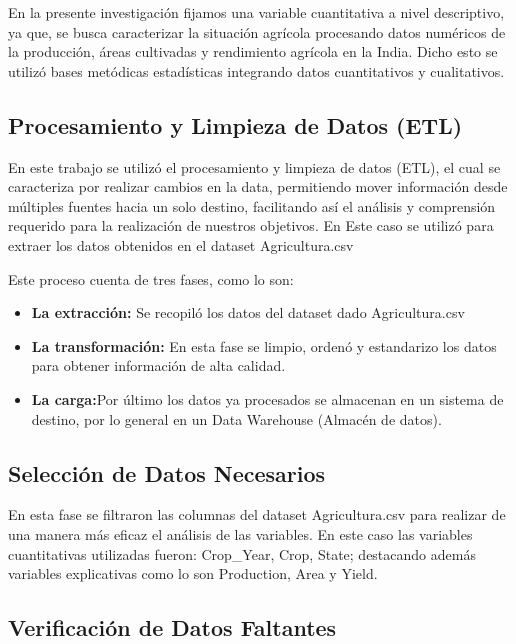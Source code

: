 \documentclass[oneside,11pt]{Latex/Classes/PhDthesisPSnPDF}
\begin{document}
En la presente investigación fijamos una variable cuantitativa a nivel
descriptivo, ya que, se busca caracterizar la situación agrícola
procesando datos numéricos de la producción, áreas cultivadas y
rendimiento agrícola en la India. Dicho esto se utilizó bases metódicas
estadísticas integrando datos cuantitativos y cualitativos.\\

\subsection{Procesamiento y Limpieza de Datos (ETL)}

En este trabajo se utilizó el procesamiento y limpieza de datos (ETL),
el cual se caracteriza por realizar cambios en la data, permitiendo
mover información desde múltiples fuentes hacia un solo destino,
facilitando así el análisis y comprensión requerido para la realización
de nuestros objetivos. En Este caso se utilizó para extraer los datos
obtenidos en el dataset Agricultura.csv

Este proceso cuenta de tres fases, como lo son:

\begin{itemize}
 \item{\textbf{La extracción:} Se recopiló los datos del dataset dado Agricultura.csv}
 \item{\textbf{La transformación:} En esta fase  se limpio, ordenó y estandarizo los datos  para obtener información de alta calidad.}
 \item{\textbf{La carga:}Por último  los datos ya procesados se almacenan en un sistema de destino, por lo general en un Data Warehouse (Almacén de datos).}
\end{itemize}

\hfill\break

\subsection{Selección de Datos Necesarios}

En esta fase se filtraron las columnas del dataset Agricultura.csv para
realizar de una manera más eficaz el análisis de las variables. En este
caso las variables cuantitativas utilizadas fueron: Crop\_Year, Crop,
State; destacando además variables explicativas como lo son Production,
Area y Yield.\\

\subsection{Verificación de Datos Faltantes}
\end{document}
